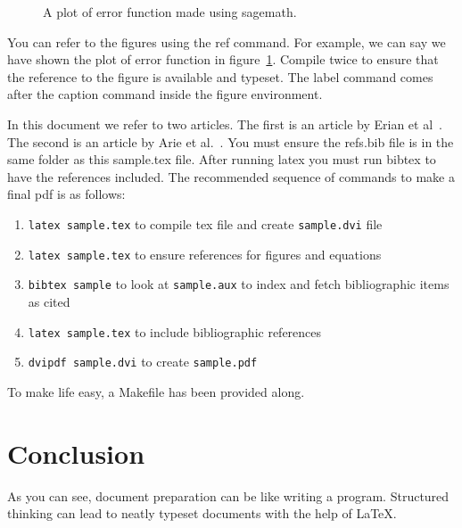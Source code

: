 \documentclass[12pt,a4paper]{article}
\begin{document}
\begin{figure}[h]
	\begin{center}
	\end{center}
	\caption{A plot of error function made using sagemath.}
	\label{erfplot}
\end{figure}

You can refer to the figures using the ref command. For example, we can say we have shown the plot of error function in figure~\ref{erfplot}. Compile twice to ensure that the reference to the figure is available and typeset. The label command comes after the caption command inside the figure environment.

In this document we refer to two articles. The first is an article by Erian et al~\cite{erian}.  
The second is an article by Arie et al.~\cite{arie}. You must ensure the refs.bib file is in the same folder as this sample.tex file. After running latex you must run bibtex to have the references included. The recommended sequence of commands to make a final pdf is as follows:

\begin{enumerate}
	\item {\tt latex sample.tex} to compile tex file and create {\tt sample.dvi} file
	\item {\tt latex sample.tex} to ensure references for figures and equations
	\item {\tt bibtex sample} to look at {\tt sample.aux} to index and fetch bibliographic items as cited
	\item {\tt latex sample.tex} to include bibliographic references
	\item {\tt dvipdf sample.dvi} to create {\tt sample.pdf} 
\end{enumerate}

To make life easy, a Makefile has been provided along.

\section{Conclusion}

As you can see, document preparation can be like writing a program. Structured thinking can lead to neatly typeset documents with the help of LaTeX.



\end{document}
